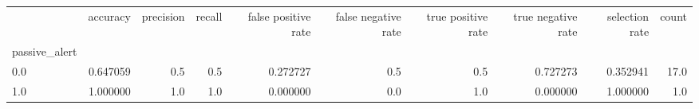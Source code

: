 \begin{tabular}{lrrrrrrrrr}
\toprule
{} &  accuracy &  precision &  recall &  false positive rate &  false negative rate &  true positive rate &  true negative rate &  selection rate &  count \\
passive\_alert &           &            &         &                      &                      &                     &                     &                 &        \\
\midrule
0.0           &  0.647059 &        0.5 &     0.5 &             0.272727 &                  0.5 &                 0.5 &            0.727273 &        0.352941 &   17.0 \\
1.0           &  1.000000 &        1.0 &     1.0 &             0.000000 &                  0.0 &                 1.0 &            0.000000 &        1.000000 &    1.0 \\
\bottomrule
\end{tabular}
